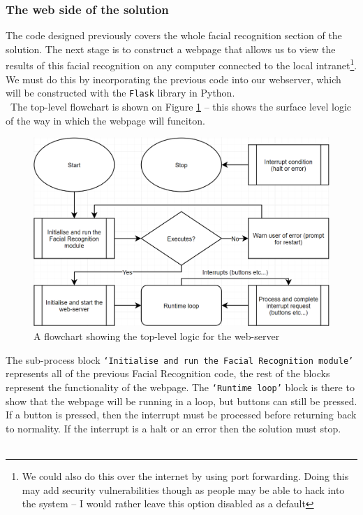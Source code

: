\documentclass[9pt]{article}
\begin{document}
\subsubsection{The web side of the solution} 
The code designed previously covers the whole facial recognition section of the solution. The next stage is to construct a webpage that allows us to view the results of this facial recognition on any computer connected to the local intranet\footnote{We could also do this over the internet by using port forwarding. Doing this may add security vulnerabilities though as people may be able to hack into the system -- I would rather leave this option disabled as a default}. We must do this by incorporating the previous code into our webserver, which will be constructed with the \texttt{Flask} library in Python. \\\
The top-level flowchart is shown on Figure \ref{fig_webserver} -- this shows the surface level logic of the way in which the webpage will funciton.
\begin{figure}[H]
	\centering
	\includegraphics[width=4.8in]{webserverWhole.png}
	\caption{A flowchart showing the top-level logic for the web-server}\label{fig_webserver}
\end{figure}
The sub-process block \texttt{`Initialise and run the Facial Recognition module'} represents all of the previous Facial Recognition code, the rest of the blocks represent the functionality of the webpage. The \texttt{`Runtime loop'} block is there to show that the webpage will be running in a loop, but buttons can still be pressed. If a button is pressed, then the interrupt must be processed before returning back to normality. If the interrupt is a halt or an error then the solution must stop.\\\\
\end{document}
